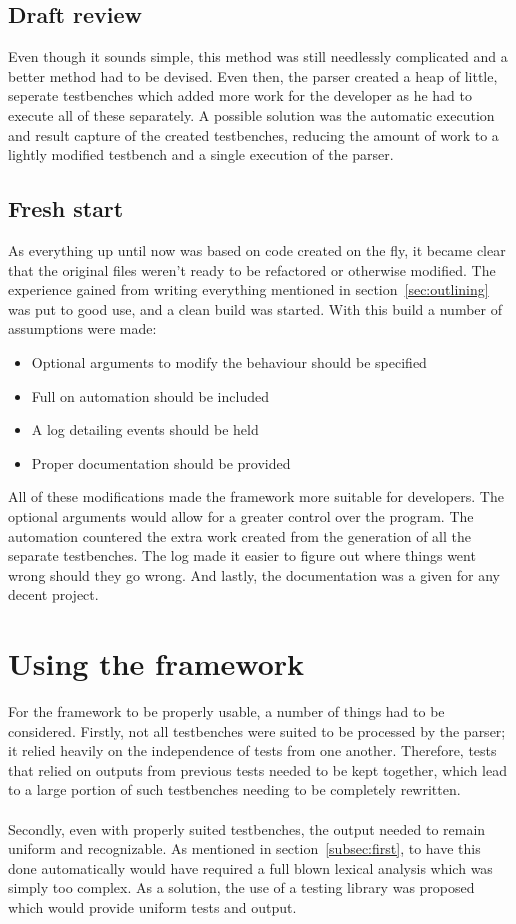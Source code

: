\documentclass[11pt,british]{article}
\begin{document}
\subsection{Draft review}
\label{subsec:review}
Even though it sounds simple, this method was still needlessly complicated and a better method had to be devised. Even then, the parser created a heap of little, seperate testbenches which added more work for the developer as he had to execute all of these separately. A possible solution was the automatic execution and result capture of the created testbenches, reducing the amount of work to a lightly modified testbench and a single execution of the parser.

\subsection{Fresh start}
As everything up until now was based on code created on the fly, it became clear that the original files weren't ready to be refactored or otherwise modified. The experience gained from writing everything mentioned in section~\ref{sec:outlining} was put to good use, and a clean build was started. With this build a number of assumptions were made:
\begin{itemize}
\item Optional arguments to modify the behaviour should be specified
\item Full on automation should be included
\item A log detailing events should be held
\item Proper documentation should be provided
\end{itemize}
All of these modifications made the framework more suitable for developers. The optional arguments would allow for a greater control over the program. The automation countered the extra work created from the generation of all the separate testbenches. The log made it easier to figure out where things went wrong should they go wrong. And lastly, the documentation was a given for any decent project.

\newpage{}
\section{Using the framework}
\label{sec:using}
For the framework to be properly usable, a number of things had to be considered. Firstly, not all testbenches were suited to be processed by the parser; it relied heavily on the independence of tests from one another. Therefore, tests that relied on outputs from previous tests needed to be kept together, which lead to a large portion of such testbenches needing to be completely rewritten.
\\
\\
Secondly, even with properly suited testbenches, the output needed to remain uniform and recognizable. As mentioned in section~\ref{subsec:first}, to have this done automatically would have required a full blown lexical analysis which was simply too complex. As a solution, the use of a testing library was proposed which would provide uniform tests and output.
\end{document}
